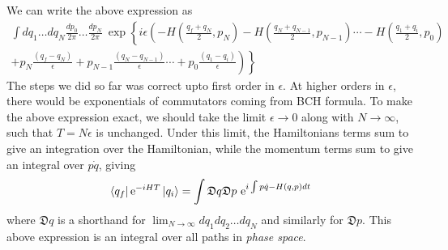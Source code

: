 \documentclass[11pt]{article}
\newcommand{\e}{\mathrm{e}}
\numberwithin{equation}{section}
\begin{document}
We can write the above expression as
\begin{align*}
    \int dq_1 \ldots dq_N \frac{dp_0}{2\pi} \ldots \frac{dp_N}{2\pi} ~\exp\left\{i\epsilon \left( -H\left(\frac{q_f + q_N}{2}, p_N\right) - H\left(\frac{q_N + q_{N-1}}{2}, p_{N-1}\right) \cdots -H\left(\frac{q_1 + q_{i}}{2}, p_0\right) \right.\right. \\
    \left.\left.+ p_N \frac{(q_f - q_N)}{\epsilon} + p_{N-1} \frac{(q_N - q_{N-1})}{\epsilon}\cdots  +  p_{0} \frac{(q_1 - q_{i})}{\epsilon} \right) \right\}
\end{align*}
The steps we did so far was correct upto first order in \(\epsilon\). At higher orders in \(\epsilon\), there would be exponentials of commutators coming from BCH formula. To make the above expression exact, we should take the limit \(\epsilon\to0\) along with \(N\to \infty\), such that \(T = N\epsilon\) is unchanged. Under this limit, the Hamiltonians terms sum to give an integration over the Hamiltonian, while the momentum terms sum to give an integral over \(p\dot q\), giving 
\begin{equation*}
    \bra{q_f} \e^{-iHT}\ket{q_i} = \int \mathfrak{D}q \mathfrak{D}p~ \e^{i \int p\dot q - H(q,p)dt}
\end{equation*}
where \(\mathfrak{D}q\) is a shorthand for \(\lim_{N\to \infty}dq_1 dq_2 \ldots dq_N  \) and similarly for \(\mathfrak{D}p\). This above expression is an integral over all paths in \textit{phase space}.\\
\end{document}
